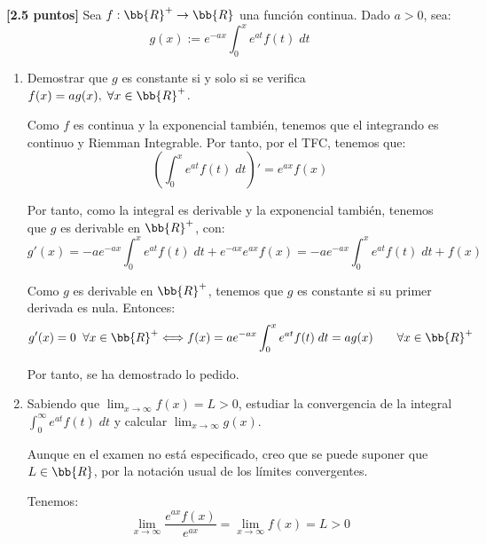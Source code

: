 \documentclass[12pt]{article}
\begin{document}
    \begin{ejercicio}\textbf{[2.5 puntos]}
    Sea $f:\bb{R}^+\to \bb{R}$ una función continua. Dado $a>0$, sea:
    \begin{equation*}
        g(x):=e^{-ax}\int_0^xe^{at}f(t)\;dt
    \end{equation*}


    \begin{enumerate}
        \item Demostrar que $g$ es constante si y solo si se verifica $f(x)=ag(x),\;\forall x\in \bb{R}^+$.

        Como $f$ es continua y la exponencial también, tenemos que el integrando es continuo y Riemman Integrable. Por tanto, por el TFC, tenemos que:$$\left(\int_0^xe^{at}f(t)\;dt\right)' = e^{ax}f(x)$$

        Por tanto, como la integral es derivable y la exponencial también, tenemos que $g$ es derivable en $\bb{R}^+$, con:
        \begin{equation*}
            g'(x)=-ae^{-ax}\int_0^xe^{at}f(t)\;dt + e^{-ax}e^{ax}f(x)
            =-ae^{-ax}\int_0^xe^{at}f(t)\;dt + f(x)
        \end{equation*}

        Como $g$ es derivable en $\bb{R}^+$, tenemos que $g$ es constante si su primer derivada es nula. Entonces:
        \begin{equation*}
            g'(x)=0 \;\;\forall x\in \bb{R}^+\Longleftrightarrow f(x)=ae^{-ax}\int_0^xe^{at}f(t)\;dt = ag(x) \qquad \forall x\in \bb{R}^+
        \end{equation*}

        Por tanto, se ha demostrado lo pedido.

        \item Sabiendo que $\displaystyle \lim_{x\to \infty}f(x)=L>0$, estudiar la convergencia de la integral $\displaystyle \int_0^\infty e^{at}f(t)\;dt$ y calcular $\displaystyle \lim_{x\to \infty}g(x)$.

        \begin{observacion}
            Aunque en el examen no está especificado, creo que se puede suponer que $L\in \bb{R}$, por la notación usual de los límites convergentes.
        \end{observacion}

        Tenemos:
        \begin{equation*}
            \lim_{x\to \infty} \frac{e^{ax}f(x)}{e^{ax}}
            = \lim_{x\to \infty} f(x) = L>0
        \end{equation*}


\end{enumerate}
\end{ejercicio}
\end{document}
